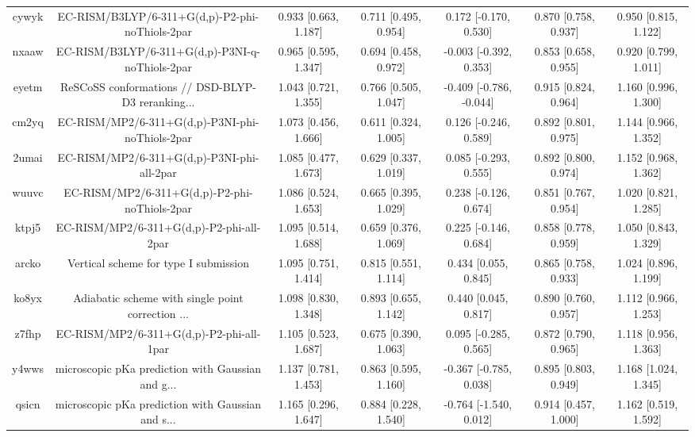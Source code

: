 \documentclass{article}
\begin{document}
\begin{center}
\begin{longtable}{|ccccccc|}
 cywyk &    EC-RISM/B3LYP/6-311+G(d,p)-P2-phi-noThiols-2par &  0.933 [0.663, 1.187] &  0.711 [0.495, 0.954] &    0.172 [-0.170, 0.530] &  0.870 [0.758, 0.937] &   0.950 [0.815, 1.122] \\
 nxaaw &    EC-RISM/B3LYP/6-311+G(d,p)-P3NI-q-noThiols-2par &  0.965 [0.595, 1.347] &  0.694 [0.458, 0.972] &   -0.003 [-0.392, 0.353] &  0.853 [0.658, 0.955] &   0.920 [0.799, 1.011] \\
 eyetm &  ReSCoSS conformations // DSD-BLYP-D3 reranking... &  1.043 [0.721, 1.355] &  0.766 [0.505, 1.047] &  -0.409 [-0.786, -0.044] &  0.915 [0.824, 0.964] &   1.160 [0.996, 1.300] \\
 cm2yq &    EC-RISM/MP2/6-311+G(d,p)-P3NI-phi-noThiols-2par &  1.073 [0.456, 1.666] &  0.611 [0.324, 1.005] &    0.126 [-0.246, 0.589] &  0.892 [0.801, 0.975] &   1.144 [0.966, 1.352] \\
 2umai &         EC-RISM/MP2/6-311+G(d,p)-P3NI-phi-all-2par &  1.085 [0.477, 1.673] &  0.629 [0.337, 1.019] &    0.085 [-0.293, 0.555] &  0.892 [0.800, 0.974] &   1.152 [0.968, 1.362] \\
 wuuvc &      EC-RISM/MP2/6-311+G(d,p)-P2-phi-noThiols-2par &  1.086 [0.524, 1.653] &  0.665 [0.395, 1.029] &    0.238 [-0.126, 0.674] &  0.851 [0.767, 0.954] &   1.020 [0.821, 1.285] \\
 ktpj5 &           EC-RISM/MP2/6-311+G(d,p)-P2-phi-all-2par &  1.095 [0.514, 1.688] &  0.659 [0.376, 1.069] &    0.225 [-0.146, 0.684] &  0.858 [0.778, 0.959] &   1.050 [0.843, 1.329] \\
 arcko &              Vertical scheme for type I submission &  1.095 [0.751, 1.414] &  0.815 [0.551, 1.114] &     0.434 [0.055, 0.845] &  0.865 [0.758, 0.933] &   1.024 [0.896, 1.199] \\
 ko8yx &  Adiabatic scheme with single point correction ... &  1.098 [0.830, 1.348] &  0.893 [0.655, 1.142] &     0.440 [0.045, 0.817] &  0.890 [0.760, 0.957] &   1.112 [0.966, 1.253] \\
 z7fhp &           EC-RISM/MP2/6-311+G(d,p)-P2-phi-all-1par &  1.105 [0.523, 1.687] &  0.675 [0.390, 1.063] &    0.095 [-0.285, 0.565] &  0.872 [0.790, 0.965] &   1.118 [0.956, 1.363] \\
 y4wws &  microscopic pKa prediction with Gaussian and g... &  1.137 [0.781, 1.453] &  0.863 [0.595, 1.160] &   -0.367 [-0.785, 0.038] &  0.895 [0.803, 0.949] &   1.168 [1.024, 1.345] \\
 qsicn &  microscopic pKa prediction with Gaussian and s... &  1.165 [0.296, 1.647] &  0.884 [0.228, 1.540] &   -0.764 [-1.540, 0.012] &  0.914 [0.457, 1.000] &   1.162 [0.519, 1.592] \\

\end{longtable}
\end{center}
\end{document}

